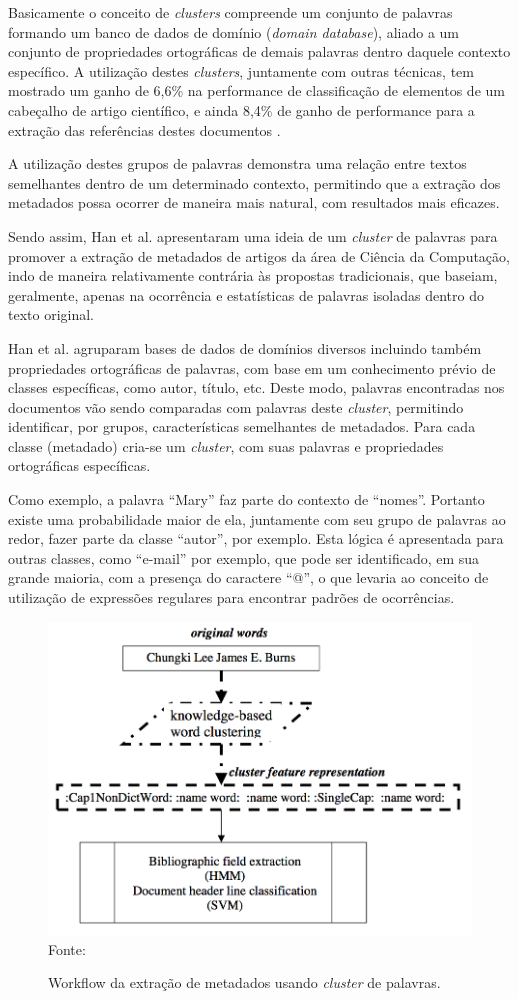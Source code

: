 Basicamente o conceito de \textit{clusters} compreende um conjunto de palavras formando um banco de dados de domínio (\textit{domain database}), aliado a um conjunto de propriedades ortográficas de demais palavras dentro daquele contexto específico. A utilização destes \textit{clusters}, juntamente com outras técnicas, tem mostrado um ganho de 6,6\% na performance de classificação de elementos de um cabeçalho de artigo científico, e ainda 8,4\% de ganho de performance para a extração das referências destes documentos \cite{Han-Giles-WC}.

A utilização destes grupos de palavras demonstra uma relação entre textos semelhantes dentro de um determinado contexto, permitindo que a extração dos metadados possa ocorrer de maneira mais natural, com resultados mais eficazes.

Sendo assim, Han et al. apresentaram uma ideia de um \textit{cluster} de palavras para promover a extração de metadados de artigos da área de Ciência da Computação, indo de maneira relativamente contrária às propostas tradicionais, que baseiam, geralmente, apenas na ocorrência e estatísticas de palavras isoladas dentro do texto original.

Han et al. agruparam bases de dados de domínios diversos incluindo também propriedades ortográficas de palavras, com base em um conhecimento prévio de classes específicas, como autor, título, etc. Deste modo, palavras encontradas nos documentos vão sendo comparadas com palavras deste \textit{cluster}, permitindo identificar, por grupos, características semelhantes de metadados. Para cada classe (metadado) cria-se um \textit{cluster}, com suas palavras e propriedades ortográficas específicas.

Como exemplo, a palavra ``Mary'' faz parte do contexto de ``nomes''. Portanto existe uma probabilidade maior de ela, juntamente com seu grupo de palavras ao redor, fazer parte da classe ``autor'', por exemplo. Esta lógica é apresentada para outras classes, como ``e-mail'' por exemplo, que pode ser identificado, em sua grande maioria, com a presença do caractere ``@'', o que levaria ao conceito de utilização de expressões regulares para encontrar padrões de ocorrências.

\begin{figure}
    \centering
    \caption{Workflow da extração de metadados usando \textit{cluster} de palavras.}
    \label{fig:workflow-rule-based}
    \includegraphics[width=0.7\linewidth]{./assets/images/workflow-rule-based}
    \center\footnotesize{Fonte: \cite{Han-Giles-WC}}
\end{figure}

